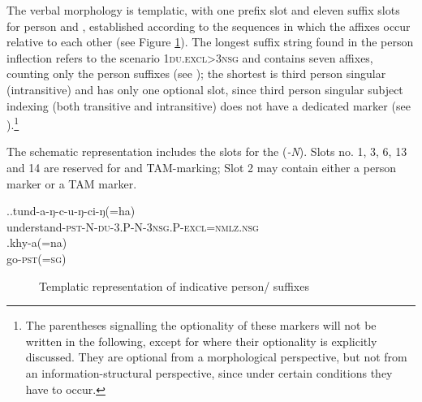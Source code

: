 








The verbal morphology is  templatic, with one prefix slot and eleven suffix slots for person and , established according to the sequences in which the affixes occur relative to each other (see Figure \ref{agr-list}). The longest suffix string found in the person inflection refers to the scenario {\scshape 1du.excl>3nsg} and contains seven affixes,  counting only the person suffixes (see \Next[a]); the shortest is third person singular (intransitive) and has only one optional slot, since third person singular subject indexing (both transitive and intransitive) does not have a dedicated marker (see \Next[b]).\footnote{The parentheses signalling the optionality of these markers will not be written in the following, except for where their optionality is explicitly discussed. They are optional from a morphological perspective, but not from an information-structural perspective, since under certain conditions they have to occur.}

The schematic representation includes the slots for the  (\emph{-N}). Slots no. 1, 3, 6,  13 and 14 are reserved for  and TAM-marking; Slot 2 may contain either a person marker or a TAM marker. 

\ex.\ag.tund-a-ŋ-c-u-ŋ-ci-ŋ(=ha)\\
understand{\scshape -pst-N-du-3.P-N-3nsg.P-excl=nmlz.nsg}\\
\bg.khy-a(=na)\\
go{\scshape -pst(=sg)}\\

\begin{figure}[htp]
\caption{Templatic representation of indicative person/ suffixes}\label{agr-list}
\end{figure} 



